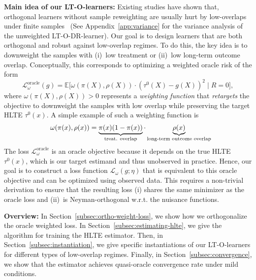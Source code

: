 \documentclass{article}
\theoremstyle{plain}
\theoremstyle{definition}
\theoremstyle{remark}
\newcommand{\1}{\mathds{1}}                %
\newcommand{\methods}{LT-O-learners\xspace}
\newcommand{\DR}{LT-O-DR-learner\xspace}
\begin{document}
\textbf{Main idea of our \methods:} Existing studies have shown that, orthogonal learners without sample reweighting are usually hurt by low-overlaps under finite samples~\cite{Fisher.2023, Frauen.2025-model, Frauen.2025-survival} (See Appendix~\ref{app:variance} for the variance analysis of the unweighted \DR). Our goal is to design learners that are both orthogonal and robust against low-overlap regimes. To do this, the key idea is to downweight the samples with (i)~low treatment or (ii)~low long-term outcome overlap. %
Conceptually, this corresponds to optimizing a weighted oracle risk of the form
\begin{equation*}
\mathcal{L}_\omega^{\text{oracle}}(g)=\mathbb{E}\bigl[\omega(\pi(X), \rho(X))\cdot(\tau^0(X)-g(X))^2 \mid R = 0\bigr],
\end{equation*}
where $\omega(\pi(X), \rho(X))>0$ represents a \textit{weighting function} that \textit{retargets} the objective to downweight the samples with low overlap while preserving the target HLTE $\tau^0(x)$. A simple example of such a weighting function is
\begin{align}
\label{example-omega}
    \omega(\pi(x),\rho(x))=\underbrace{\pi(x)(1-\pi(x))}_{\text{treat. overlap}} \cdot\underbrace{\rho(x)}_{\text{long-term outcome overlap}}
\hspace{-0.3cm}
\end{align}
The loss $\mathcal{L}_\omega^{\text{oracle}}$ is an oracle objective because it depends on the true HLTE $\tau^0(x)$, which is our target estimand and thus unobserved in practice. Hence, our goal is to construct a loss function $\mathcal{L}_\omega(g;\eta)$ that is equivalent to this oracle objective and can be optimized using observed data. This requires a non-trivial derivation to ensure that the resulting loss (i) shares the same minimizer as the oracle loss and (ii)~is Neyman-orthogonal w.r.t. the nuisance functions.


\textbf{Overview:} In Section~\ref{subsec:ortho-weight-loss}, we show how we orthogonalize the oracle weighted loss. In Section~\ref{subsec:estimating-hlte}, we give the algorithm for training the HLTE estimator. Then, in Section~\ref{subsec:instantiation}, we give specific instantiations of our \methods for different types of low-overlap regimes. Finally, in Section~\ref{subsec:convergence}, we show that the estimator achieves quasi-oracle convergence rate under mild conditions.
\end{document}
